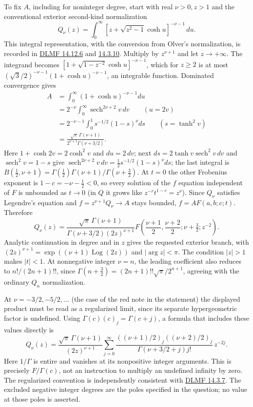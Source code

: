 To fix $A$, including for noninteger degree, start with real
$\nu>0,z>1$ and the conventional exterior second-kind normalization
\[
Q_\nu(z)=\int_0^\infty
 [z+\sqrt{z^2-1}\cosh u]^{-\nu-1}\,du.
\]
This integral representation, with the conversion from Olver's
normalization, is recorded in
\href{https://dlmf.nist.gov/14.12.E6}{DLMF 14.12.6} and
\href{https://dlmf.nist.gov/14.3.E10}{14.3.10}.
Multiply by $z^{\nu+1}$ and let $z\to+\infty$.
The integrand becomes $[1+\sqrt{1-z^{-2}}\cosh u]^{-\nu-1}$, which
for $z\ge2$ is at most $(\sqrt3/2)^{-\nu-1}(1+\cosh u)^{-\nu-1}$,
an integrable function.  Dominated convergence gives
\begin{align*}
A&=\int_0^\infty(1+\cosh u)^{-\nu-1}du\\
 &=2^{-\nu}\int_0^\infty\operatorname{sech}^{2\nu+2}v\,dv
 \qquad(u=2v)\\
 &=2^{-\nu-1}\int_0^1 s^{-1/2}(1-s)^\nu ds
 \qquad(s=\tanh^2v)\\
 &=\frac{\sqrt\pi\,\Gamma(\nu+1)}{2^{\nu+1}\Gamma(\nu+3/2)}.
\end{align*}
Here $1+\cosh2v=2\cosh^2v$ and $du=2\,dv$; next
$ds=2\tanh v\operatorname{sech}^2v\,dv$ and
$\operatorname{sech}^2v=1-s$ give
$\operatorname{sech}^{2\nu+2}v\,dv=\frac12s^{-1/2}(1-s)^\nu ds$;
the last integral is
$B(\frac12,\nu+1)=\Gamma(\frac12)\Gamma(\nu+1)/\Gamma(\nu+\frac32)$.
At $t=0$ the other Frobenius exponent is $1-c=-\nu-\frac12<0$, so
every solution of the $f$ equation independent of $F$ is unbounded
as $t\to0$ (in $Q$ it grows like $z^{-r}t^{1-c}=z^\nu$).  Since
$Q_\nu$ satisfies Legendre's equation and $f=z^{\nu+1}Q_\nu\to A$
stays bounded, $f=AF(a,b;c;t)$.  Therefore
\[
\boxed{Q_\nu(z)=
 \frac{\sqrt\pi\,\Gamma(\nu+1)}{\Gamma(\nu+3/2)(2z)^{\nu+1}}
 F\!\left(\frac{\nu+1}2,\frac{\nu+2}2;
                 \nu+\tfrac32;z^{-2}\right)}.
\]
Analytic continuation in degree and in $z$ gives the requested
exterior branch, with $(2z)^{\nu+1}=\exp((\nu+1)\operatorname{Log}(2z))$
and $|\arg z|<\pi$.  The condition $|z|>1$ makes $|t|<1$.
At nonnegative integer $\nu=n$, the leading coefficient also reduces
to $n!/(2n+1)!!$, since $\Gamma(n+\frac32)=(2n+1)!!\sqrt\pi/2^{n+1}$,
agreeing with the ordinary $Q_n$ normalization.

At $\nu=-3/2,-5/2,\ldots$ (the case of the red note in the
statement) the displayed product must be read as a regularized
limit, since its separate hypergeometric factor is undefined.
Using $\Gamma(c)(c)_j=\Gamma(c+j)$, a formula that includes these
values directly is
\[
Q_\nu(z)=\frac{\sqrt\pi\,\Gamma(\nu+1)}{(2z)^{\nu+1}}
 \sum_{j=0}^\infty
 \frac{((\nu+1)/2)_j((\nu+2)/2)_j}
      {\Gamma(\nu+3/2+j)j!}\,z^{-2j}.
\]
Here $1/\Gamma$ is entire and vanishes at its nonpositive integer
arguments.  This is precisely $F/\Gamma(c)$, not an instruction to
multiply an undefined infinity by zero.  The regularized convention
is independently consistent with
\href{https://dlmf.nist.gov/14.3.E7}{DLMF 14.3.7}.
The excluded negative integer degrees are the poles specified in the
question; no value at those poles is asserted.

